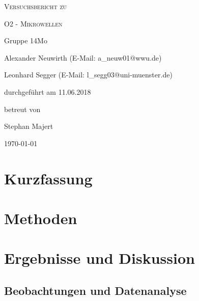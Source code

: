 \documentclass[
	a4paper,
	12pt,
	pagesize,
	ngerman
]{scrartcl}
\begin{document}
	
	\begin{titlepage}
		\centering
		{\scshape\LARGE Versuchsbericht zu \par}
		\vspace{1cm}
		{\scshape\huge O2 - Mikrowellen \par}
		\vspace{2.5cm}
		{\LARGE Gruppe 14Mo \par}
		\vspace{0.5cm}
		
		{\large Alexander Neuwirth (E-Mail: a\_neuw01@wwu.de) \par}
		{\large Leonhard Segger (E-Mail: l\_segg03@uni-muenster.de) \par}
		\vfill
		
		durchgeführt am 11.06.2018\par
		betreut von\par
		{\large Stephan Majert}
		
		\vfill
		
		{\large \today\par}
	\end{titlepage}
	\tableofcontents
	\newpage


	\section{Kurzfassung}
	
	\section{Methoden}
	
	
	\section{Ergebnisse und Diskussion}
	

	\subsection{Beobachtungen und Datenanalyse}
\end{document}

